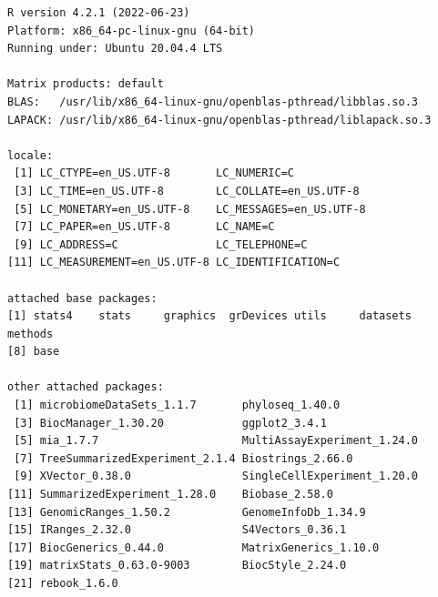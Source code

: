 \documentclass[
]{book}
\begin{document}
\begin{verbatim}
R version 4.2.1 (2022-06-23)
Platform: x86_64-pc-linux-gnu (64-bit)
Running under: Ubuntu 20.04.4 LTS

Matrix products: default
BLAS:   /usr/lib/x86_64-linux-gnu/openblas-pthread/libblas.so.3
LAPACK: /usr/lib/x86_64-linux-gnu/openblas-pthread/liblapack.so.3

locale:
 [1] LC_CTYPE=en_US.UTF-8       LC_NUMERIC=C              
 [3] LC_TIME=en_US.UTF-8        LC_COLLATE=en_US.UTF-8    
 [5] LC_MONETARY=en_US.UTF-8    LC_MESSAGES=en_US.UTF-8   
 [7] LC_PAPER=en_US.UTF-8       LC_NAME=C                 
 [9] LC_ADDRESS=C               LC_TELEPHONE=C            
[11] LC_MEASUREMENT=en_US.UTF-8 LC_IDENTIFICATION=C       

attached base packages:
[1] stats4    stats     graphics  grDevices utils     datasets  methods  
[8] base     

other attached packages:
 [1] microbiomeDataSets_1.1.7       phyloseq_1.40.0               
 [3] BiocManager_1.30.20            ggplot2_3.4.1                 
 [5] mia_1.7.7                      MultiAssayExperiment_1.24.0   
 [7] TreeSummarizedExperiment_2.1.4 Biostrings_2.66.0             
 [9] XVector_0.38.0                 SingleCellExperiment_1.20.0   
[11] SummarizedExperiment_1.28.0    Biobase_2.58.0                
[13] GenomicRanges_1.50.2           GenomeInfoDb_1.34.9           
[15] IRanges_2.32.0                 S4Vectors_0.36.1              
[17] BiocGenerics_0.44.0            MatrixGenerics_1.10.0         
[19] matrixStats_0.63.0-9003        BiocStyle_2.24.0              
[21] rebook_1.6.0                  


\end{verbatim}
\end{document}
